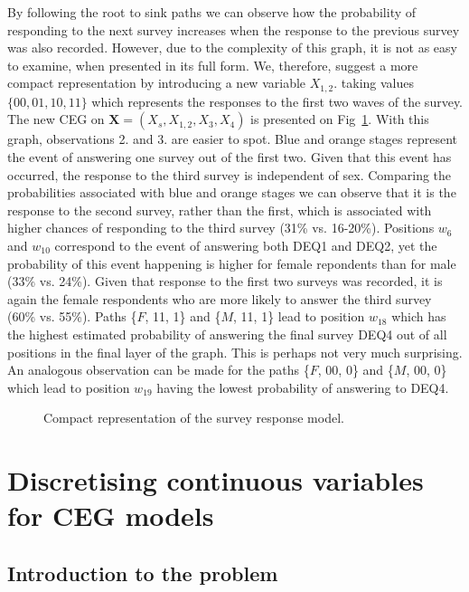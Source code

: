 \documentclass[runningheads]{llncs}
\begin{document}
By following the root to sink paths we can observe how the probability of responding to the next survey increases when the response to the previous survey was also recorded. However, due to the complexity of this graph, it is not as easy to examine, when presented in its full form. We, therefore, suggest a more compact representation by introducing a new variable $X_{1,2}$. taking values $\{00, 01, 10, 11\}$ which represents the responses to the first two waves of the survey. The new CEG on $\boldsymbol{X} = (X_s, X_{1,2}, X_3, X_4)$ is presented on Fig~\ref{ceg:compact-responses}. With this graph, observations 2. and 3. are easier to spot. Blue and orange stages represent the event of answering one survey out of the first two. Given that this event has occurred, the response to the third survey is independent of sex. Comparing the probabilities associated with blue and orange stages we can observe that it is the response to the second survey, rather than the first, which is associated with higher chances of responding to the third survey (31\% vs. 16-20\%). Positions $w_6$ and $w_{10}$ correspond to the event of answering both DEQ1 and DEQ2, yet the probability of this event happening is higher for female repondents than for male (33\% vs. 24\%). Given that response to the first two surveys was recorded, it is again the female respondents who are more likely to answer the third survey (60\% vs. 55\%). Paths \{$F$, 11, 1\} and \{$M$, 11, 1\} lead to position $w_{18}$ which has the highest estimated probability of answering the final survey DEQ4 out of all positions in the final layer of the graph. This is perhaps not very much surprising. An analogous observation can be made for the paths \{$F$, 00, 0\} and \{$M$, 00, 0\} which lead to position $w_{19}$ having the lowest probability of answering to DEQ4.
\begin{figure}
\centering

\vspace{1ex}
\caption{Compact representation of the survey response model.}
\label{ceg:compact-responses}
\end{figure}


%
%
\section{Discretising continuous variables for CEG models}\label{sec:discretise}

\subsection{Introduction to the problem}
\end{document}
